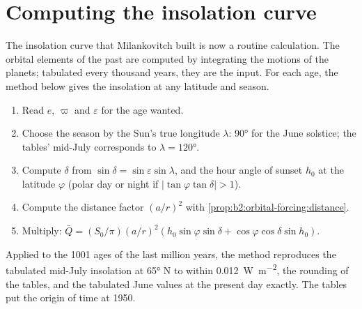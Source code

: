 \section{Computing the insolation curve}\label{sec:b2:orbital-forcing:curve}

The insolation curve that Milankovitch built is now a routine calculation. The orbital elements of
the past are computed by integrating the motions of the planets; tabulated every thousand years,
they are the input. For each age, the method below gives the insolation at any latitude and season.

\begin{method}\label{met:b2:orbital-forcing:curve}
\begin{enumerate}
  \item Read $e$, $\varpi$ and $\varepsilon$ for the age wanted.
  \item Choose the season by the Sun's true longitude $\lambda$: \ang{90} for the June solstice;
        the tables' mid-July corresponds to $\lambda = \ang{120}$.
  \item Compute $\delta$ from $\sin\delta = \sin\varepsilon\sin\lambda$, and the hour angle of
        sunset $h_0$ at the latitude $\varphi$ (polar day or night if $|\tan\varphi\tan\delta| > 1$).
  \item Compute the distance factor $(a/r)^2$ with \cref{prop:b2:orbital-forcing:distance}.
  \item Multiply: $\bar Q = (S_0/\pi)(a/r)^2(h_0\sin\varphi\sin\delta +
        \cos\varphi\cos\delta\sin h_0)$.
\end{enumerate}
\end{method}

Applied to the 1001 ages of the last million years, the method reproduces the tabulated mid-July
insolation at \ang{65} N to within \qty{0.012}{W.m^{-2}}, the rounding of the tables, and the
tabulated June values at the present day exactly. The tables put the origin of time at 1950.

